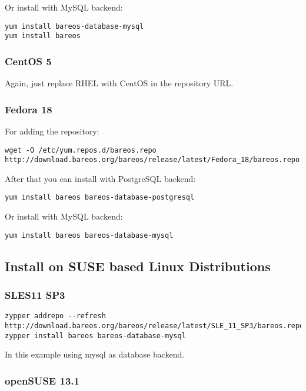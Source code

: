 Or install with MySQL backend:
\begin{verbatim}
yum install bareos-database-mysql
yum install bareos
\end{verbatim}

\subsubsection{CentOS 5}

Again, just replace RHEL with CentOS in the repository URL.

\subsubsection{Fedora 18}

For adding the repository:
\begin{verbatim}
wget -O /etc/yum.repos.d/bareos.repo http://download.bareos.org/bareos/release/latest/Fedora_18/bareos.repo
\end{verbatim}

After that you can install with PostgreSQL backend:
\begin{verbatim}
yum install bareos bareos-database-postgresql
\end{verbatim}

Or install with MySQL backend:
\begin{verbatim}
yum install bareos bareos-database-mysql
\end{verbatim}

\subsection{Install on SUSE based Linux Distributions}

\subsubsection{SLES11 SP3}

\begin{verbatim}
zypper addrepo --refresh http://download.bareos.org/bareos/release/latest/SLE_11_SP3/bareos.repo
zypper install bareos bareos-database-mysql
\end{verbatim}
In this example using mysql as database backend.

\subsubsection{openSUSE 13.1}

